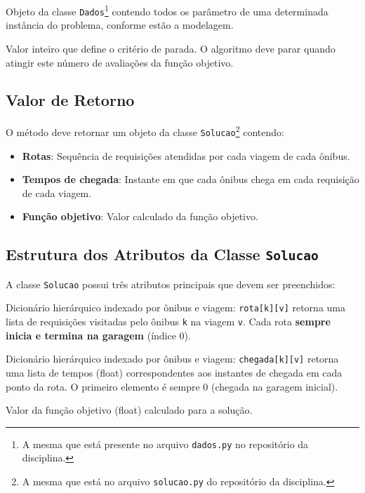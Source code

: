 \documentclass[12pt,a4paper]{article}
\begin{document}
\begin{description}[leftmargin=3cm,style=nextline]
    \item[\texttt{dados}] Objeto da classe \texttt{Dados}\footnote{A mesma que está presente no arquivo \texttt{dados.py} no repositório da disciplina.} contendo todos os parâmetro de uma determinada instância do problema, conforme estão a modelagem.
    \item[\texttt{numero\_avaliacoes}] Valor inteiro que define o critério de parada. O algoritmo deve parar quando atingir este número de avaliações da função objetivo.
\end{description}

\subsection{Valor de Retorno}

O método deve retornar um objeto da classe \texttt{Solucao}\footnote{A mesma que está no arquivo \texttt{solucao.py} do repositório da disciplina.} contendo:

\begin{itemize}
    \item \textbf{Rotas}: Sequência de requisições atendidas por cada viagem de cada ônibus.
    \item \textbf{Tempos de chegada}: Instante em que cada ônibus chega em cada requisição de cada viagem.
    \item \textbf{Função objetivo}: Valor calculado da função objetivo.
\end{itemize}

\subsection{Estrutura dos Atributos da Classe \texttt{Solucao}}

A classe \texttt{Solucao} possui três atributos principais que devem ser preenchidos:

\begin{description}[leftmargin=3cm,style=nextline]
    \item[\texttt{rota}] Dicionário hierárquico indexado por ônibus e viagem: \texttt{rota[k][v]} retorna uma lista de requisições visitadas pelo ônibus \texttt{k} na viagem \texttt{v}. Cada rota \textbf{sempre inicia e termina na garagem} (índice 0).
    
    \item[\texttt{chegada}] Dicionário hierárquico indexado por ônibus e viagem: \texttt{chegada[k][v]} retorna uma lista de tempos (float) correspondentes aos instantes de chegada em cada ponto da rota. O primeiro elemento é sempre 0 (chegada na garagem inicial).
    
    \item[\texttt{fx}] Valor da função objetivo (float) calculado para a solução.
\end{description}
\end{document}
